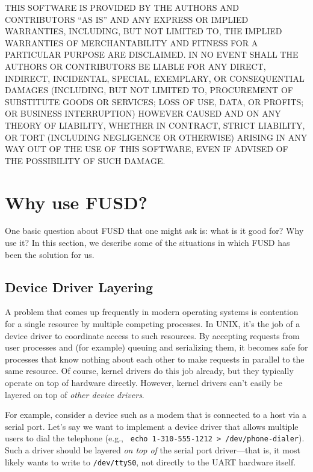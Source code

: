 \documentclass{article}
\begin{document}
THIS SOFTWARE IS PROVIDED BY THE AUTHORS AND CONTRIBUTORS ``AS IS'' AND
ANY EXPRESS OR IMPLIED WARRANTIES, INCLUDING, BUT NOT LIMITED TO, THE
IMPLIED WARRANTIES OF MERCHANTABILITY AND FITNESS FOR A PARTICULAR
PURPOSE ARE DISCLAIMED. IN NO EVENT SHALL THE AUTHORS OR CONTRIBUTORS
BE LIABLE FOR ANY DIRECT, INDIRECT, INCIDENTAL, SPECIAL, EXEMPLARY, OR
CONSEQUENTIAL DAMAGES (INCLUDING, BUT NOT LIMITED TO, PROCUREMENT OF
SUBSTITUTE GOODS OR SERVICES; LOSS OF USE, DATA, OR PROFITS; OR
BUSINESS INTERRUPTION) HOWEVER CAUSED AND ON ANY THEORY OF LIABILITY,
WHETHER IN CONTRACT, STRICT LIABILITY, OR TORT (INCLUDING NEGLIGENCE
OR OTHERWISE) ARISING IN ANY WAY OUT OF THE USE OF THIS SOFTWARE, EVEN
IF ADVISED OF THE POSSIBILITY OF SUCH DAMAGE.

\section{Why use FUSD?}
\label{use-cases}

One basic question about FUSD that one might ask is: what is it good
for?  Why use it?  In this section, we describe some of the situations
in which FUSD has been the solution for us.

\subsection{Device Driver Layering}

A problem that comes up frequently in modern operating systems is
contention for a single resource by multiple competing processes.  In
UNIX, it's the job of a device driver to coordinate access to such
resources.  By accepting requests from user processes and (for
example) queuing and serializing them, it becomes safe for processes
that know nothing about each other to make requests in parallel to the
same resource.  Of course, kernel drivers do this job already, but
they typically operate on top of hardware directly.  However, kernel
drivers can't easily be layered on top of {\em other device drivers}.

For example, consider a device such as a modem that is connected to a
host via a serial port.  Let's say we want to implement a device
driver that allows multiple users to dial the telephone (e.g., {\tt
echo 1-310-555-1212 > /dev/phone-dialer}).  Such a driver should be
layered {\em on top of} the serial port driver---that is, it most
likely wants to write to {\tt /dev/ttyS0}, not directly to the UART
hardware itself.
\end{document}
